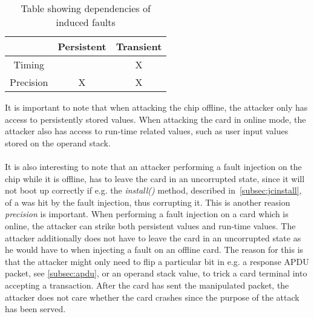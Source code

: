 \begin{table}[h!]
\centering
\begin{tabular}{|c|c|c|}
\hline  & Persistent & Transient \\ 
\hline Timing &  & X \\ 
\hline Precision & X & X \\ 
\hline 
\end{tabular} 
\caption{Table showing dependencies of induced faults}
\label{tab:dependencies}
\end{table}

It is important to note that when attacking the chip offline, the attacker only has access to persistently stored values. When attacking the card in online mode, the attacker also has access to run-time related values, such as user input values stored on the operand stack.\\\\
It is also interesting to note that an attacker performing a fault injection on the chip while it is offline, has to leave the card in an uncorrupted state, since it will not boot up correctly if e.g. the \textit{install()} method, described in~\cref{subsec:jcinstall}, of a \jc was hit by the fault injection, thus corrupting it. This is another reasion \textit{precision} is important. When performing a fault injection on a card which is online, the attacker can strike both persistent values and run-time values. The attacker additionally does not have to leave the card in an uncorrupted state as he would have to when injecting a fault on an offline card. The reason for this is that the attacker might only need to flip a particular bit in e.g. a response APDU packet, see \cref{subsec:apdu}, or an operand stack value, to trick a card terminal into accepting a transaction. After the card has sent the manipulated packet, the attacker does not care whether the card crashes since the purpose of the attack has been served.